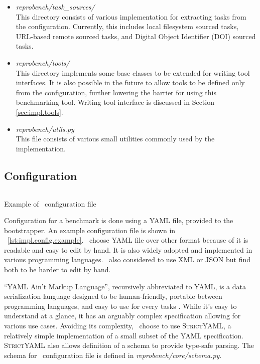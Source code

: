 \begin{itemize}
    \item \emph{reprobench/task\_sources/}\\
          This directory consists of various implementation for extracting tasks from the configuration.
          Currently, this includes local filesystem sourced tasks, URL-based remote sourced tasks, and Digital Object Identifier (DOI) sourced tasks.

    \item \emph{reprobench/tools/}\\
          This directory implements some base classes to be extended for writing tool interfaces.
          It is also possible in the future to allow tools to be defined only from the configuration, further lowering the barrier for using this benchmarking tool.
          Writing tool interface is discussed in Section \ref{sec:impl.tools}.

    \item \emph{reprobench/utils.py}\\
          This file consists of various small utilities commonly used by the implementation.


\end{itemize}


\subsection{Configuration}

\begin{listing}
    \inputminted{yaml}{assets/listings/pseudocodes/config.yml}
    \caption{Example of \OurBenchmarkingTool~configuration file}
    \label{lst:impl.config.example}
\end{listing}

Configuration for a benchmark is done using a YAML file, provided to the bootstrapper.
An example configuration file is shown in \lst~\ref{lst:impl.config.example}.
\First~choose YAML file over other format because of it is readable and easy to edit by hand.
It is also widely adopted and implemented in various programming languages.
\First~also considered to use XML or JSON but find both to be harder to edit by hand.

``YAML Ain’t Markup Language'', recursively abbreviated to YAML, is a data serialization language designed to be human-friendly, portable between programming languages, and easy to use for every tasks \citep{ben2005yaml}.
While it's easy to understand at a glance, it has an arguably complex specification allowing for various use cases.
Avoiding its complexity, \first~choose to use \textsc{StrictYAML}, a relatively simple implementation of a small subset of the YAML specification.
\textsc{StrictYAML} also allows definition of a schema to provide type-safe parsing.
The schema for \OurBenchmarkingTool~configuration file is defined in \emph{reprobench/core/schema.py}.


